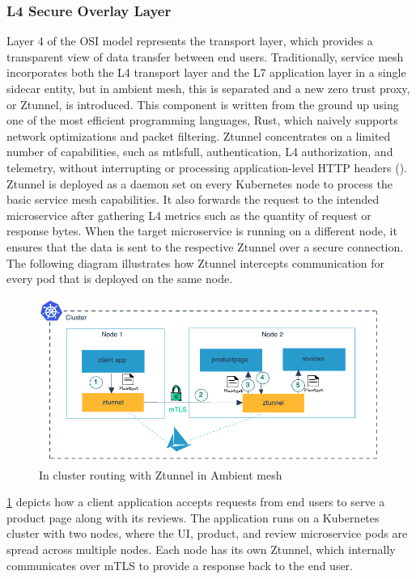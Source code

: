\subsubsection{L4 Secure Overlay Layer}
Layer 4 of the OSI model represents the transport layer, which provides a transparent view of data transfer between end users. Traditionally, service mesh incorporates both the L4 transport layer and the L7 application layer in a single sidecar entity, but in ambient mesh, this is separated and a new zero trust proxy, or Ztunnel, is introduced. This component is written from the ground up using one of the most efficient programming languages, Rust, which naively supports network optimizations and packet filtering. Ztunnel concentrates on a limited number of capabilities, such as \Gls{mtlsfull}, authentication, L4 authorization, and telemetry, without interrupting or processing application-level HTTP headers (\cite{istioSun2023}). Ztunnel is deployed as a daemon set on every Kubernetes node to process the basic service mesh capabilities. It also forwards the request to the intended microservice after gathering L4 metrics such as the quantity of request or response bytes. When the target microservice is running on a different node, it ensures that the data is sent to the respective Ztunnel over a secure  connection. The following diagram illustrates how Ztunnel intercepts communication for every pod that is deployed on the same node.

\begin{figure}[ht!]
  \centering
  \includegraphics[width=0.7\linewidth]{resources/ambient-routing-l4.png}
  \caption{In cluster routing with Ztunnel in Ambient mesh}
  \label{lr:ztunnelDesign}
\end{figure}

\ref{lr:ztunnelDesign} depicts how a client application accepts requests from end users to serve a product page along with its reviews. The application runs on a Kubernetes cluster with two nodes, where the UI, product, and review microservice pods are spread across multiple nodes. Each node has its own Ztunnel, which internally communicates over mTLS to provide a response back to the end user.

